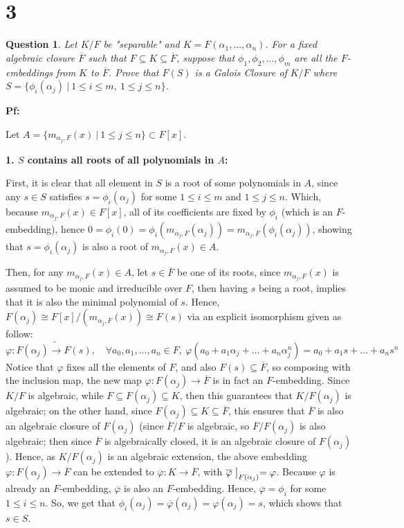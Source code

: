\documentclass{article}
\newtheorem{question}{Question}
\begin{document}
\break

\section*{3}
\begin{myBox}[]{}
    \begin{question}
        Let $K/F$ be "separable" and $K=F(\alpha_1,...,\alpha_n)$. For a fixed algebraic closure $\overline{F}$ such that $F\subseteq K\subseteq \overline{F}$, suppose that $\phi_1,\phi_2,...,\phi_m$ are all the $F$-embeddings from $K$ to $\overline{F}$. Prove that $F(S)$ is a Galois Closure of $K/F$ where $S=\{\phi_i(\alpha_j)\ |\ 1\leq i\leq m,\ 1\leq j\leq n\}$.
    \end{question}
\end{myBox}

\textbf{Pf:}

Let $A=\{m_{\alpha_j,F}(x)\ |\ 1\leq j\leq n\}\subset F[x]$.

\textbf{1. $S$ contains all roots of all polynomials in $A$:}

First, it is clear that all element in $S$ is a root of some polynomials in $A$, since any $s\in S$ satisfies $s=\phi_i(\alpha_j)$ for some $1\leq i\leq m$ and $1\leq j\leq n$. Which, because $m_{\alpha_j,F}(x)\in F[x]$, all of its coefficients are fixed by $\phi_i$ (which is an $F$-embedding), hence $0 = \phi_i(0)=\phi_i(m_{\alpha_j,F}(\alpha_j)) = m_{\alpha_j,F}(\phi_i(\alpha_j))$, showing that $s=\phi_i(\alpha_j)$ is also a root of $m_{\alpha_j,F}(x)\in A$.

Then, for any $m_{\alpha_j,F}(x)\in A$, let $s\in \overline{F}$ be one of its roots, since $m_{\alpha_j,F}(x)$ is assumed to be monic and irreducible over $F$, then having $s$ being a root, implies that it is also the minimal polynomial of $s$. Hence, $F(\alpha_j)\cong F[x]/(m_{\alpha_j,F}(x))\cong F(s)$ via an explicit isomorphism given as follow:
$$\varphi:F(\alpha_j)\tilde{\rightarrow}F(s),\quad \forall a_0,a_1,...,a_n\in F,\ \varphi(a_0+a_1\alpha_j+...+a_n\alpha_j^n)=a_0+a_1s+...+a_ns^n$$
Notice that $\varphi$ fixes all the elements of $F$, and also $F(s)\subseteq\overline{F}$, so composing with the inclusion map, the new map $\varphi:F(\alpha_j)\rightarrow\overline{F}$ is in fact an $F$-embedding.
Since $K/F$ is algebraic, while $F\subseteq F(\alpha_j)\subseteq K$, then this guarantees that $K/F(\alpha_j)$ is algebraic; on the other hand, since $F(\alpha_j)\subseteq K\subseteq \overline{F}$, this ensures that $\overline{F}$ is also an algebraic closure of $F(\alpha_j)$ (since $\overline{F}/F$ is algebraic, so $\overline{F}/F(\alpha_j)$ is also algebraic; then since $\overline{F}$ is algebraically closed, it is an algebraic closure of $F(\alpha_j)$). Hence, as $K/F(\alpha_j)$ is an algebraic extension, the above embedding $\varphi:F(\alpha_j)\rightarrow\overline{F}$ can be extended to $\overline{\varphi}:K\rightarrow\overline{F}$, with $\overline{\varphi}\bigm|_{F(\alpha_j)}=\varphi$. Because $\varphi$ is already an $F$-embedding, $\overline{\varphi}$ is also an $F$-embedding. Hence, $\overline{\varphi} = \phi_i$ for some $1\leq i\leq n$.
So, we get that $\phi_i(\alpha_j) = \overline{\varphi}(\alpha_j) = \varphi(\alpha_j) = s$, which shows that $s\in S$.
\end{document}
